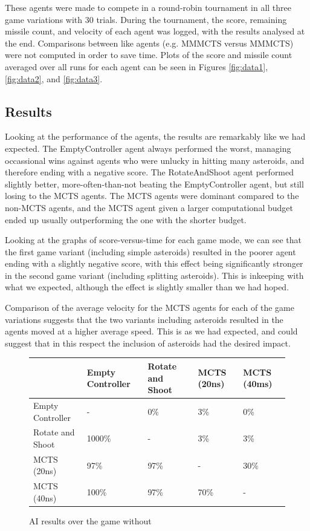 These agents were made to compete in a round-robin tournament in all three game variations with 30 trials. During the tournament, the score, remaining missile count, and velocity of each agent was logged, with the results analysed at the end. Comparisons between like agents (e.g. MMMCTS versus MMMCTS) were not computed in order to save time. Plots of the score and missile count averaged over all runs for each agent can be seen in Figures \ref{fig:data1}, \ref{fig:data2}, and \ref{fig:data3}.

\subsection{Results}

Looking at the performance of the agents, the results are remarkably like we had expected. The EmptyController agent always performed the worst, managing occassional wins against agents who were unlucky in hitting many asteroids, and therefore ending with a negative score. The RotateAndShoot agent performed slightly better, more-often-than-not beating the EmptyController agent, but still losing to the MCTS agents. The MCTS agents were dominant compared to the non-MCTS agents, and the MCTS agent given a larger computational budget ended up usually outperforming the one with the shorter budget.

Looking at the graphs of score-versus-time for each game mode, we can see that the first game variant (including simple asteroids) resulted in the poorer agent ending with a slightly negative score, with this effect being significantly stronger in the second game variant (including splitting asteroids). This is inkeeping with what we expected, although the effect is slightly smaller than we had hoped.

Comparison of the average velocity for the MCTS agents for each of the game variations suggests that the two variants including asteroids resulted in the agents moved at a higher average speed. This is as we had expected, and could suggest that in this respect the inclusion of asteroids had the desired impact.

\begin{figure}
	\caption{AI results over the game without}
	\begin{tabular}{p{7.5em} | p{4.5em} p{4.5em} p{4.5em} p{4.5em}}
		&
			Empty Controller &
			Rotate and Shoot &
			MCTS (20ns) &
			MCTS (40ms) \\ \hline
		Empty Controller &
			-&
			0\% &
			3\% &
			0\% \\
		Rotate and Shoot &
			1000\% &
			-&
			3\% &
			3\% \\ 
		MCTS (20ns) &
			97\% &
			97\% &
			-&
			30\% \\
		MCTS (40ns) &
			100\% &
			97\% &
			70\% &
			-\\
	\end{tabular}
\end{figure}

